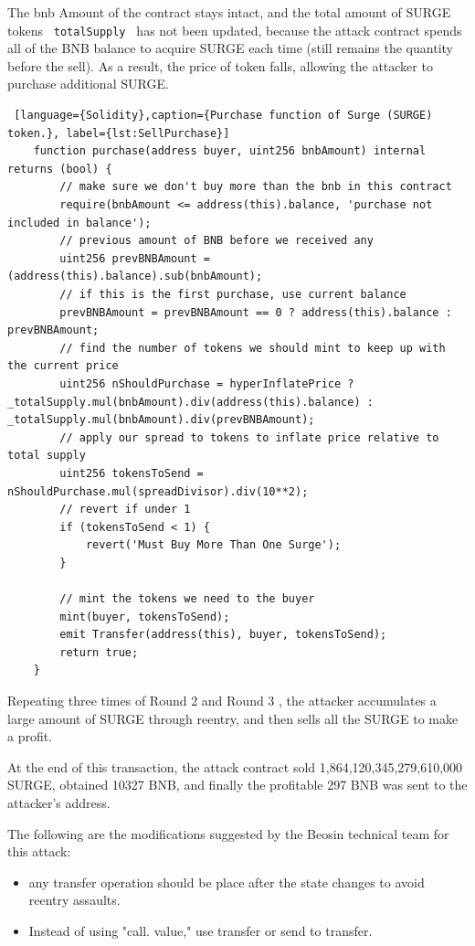 The bnb Amount of the contract stays intact, and the total amount of SURGE tokens \texttt{ totalSupply }  
has not been updated, because the attack contract spends all of the BNB balance to acquire SURGE
 each time (still remains the quantity before the sell).
As a result, the price of token falls, allowing the attacker to purchase additional SURGE. 


\begin{lstlisting} [language={Solidity},caption={Purchase function of Surge (SURGE) token.}, label={lst:SellPurchase}]
    function purchase(address buyer, uint256 bnbAmount) internal returns (bool) {
        // make sure we don't buy more than the bnb in this contract
        require(bnbAmount <= address(this).balance, 'purchase not included in balance');
        // previous amount of BNB before we received any        
        uint256 prevBNBAmount = (address(this).balance).sub(bnbAmount);
        // if this is the first purchase, use current balance
        prevBNBAmount = prevBNBAmount == 0 ? address(this).balance : prevBNBAmount;
        // find the number of tokens we should mint to keep up with the current price
        uint256 nShouldPurchase = hyperInflatePrice ? _totalSupply.mul(bnbAmount).div(address(this).balance) : _totalSupply.mul(bnbAmount).div(prevBNBAmount);
        // apply our spread to tokens to inflate price relative to total supply
        uint256 tokensToSend = nShouldPurchase.mul(spreadDivisor).div(10**2);
        // revert if under 1
        if (tokensToSend < 1) {
            revert('Must Buy More Than One Surge');
        }
        
        // mint the tokens we need to the buyer
        mint(buyer, tokensToSend);
        emit Transfer(address(this), buyer, tokensToSend);
        return true;
    }
\end{lstlisting}

Repeating three times of Round 2 and Round 3 , the attacker accumulates a large amount of SURGE through reentry, and then sells all the SURGE to make a profit.

At the end of this transaction, the attack contract sold 1,864,120,345,279,610,000 SURGE, 
obtained 10327 BNB, and finally the profitable 297 BNB was sent to the attacker's address.

The following are the modifications suggested by the Beosin technical team for this attack:
\begin{itemize}
    \item any transfer operation should be place after the state changes to avoid reentry assaults.
    \item Instead of using "call. value," use transfer or send to transfer. 
\end{itemize}


